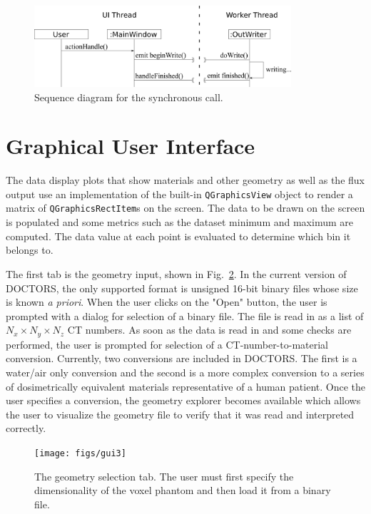 \begin{figure}[tb]
  \begin{center}
   \includegraphics[width=3.75in]{figs/writer_async}
  \end{center}
  \caption{Sequence diagram for the synchronous call.}
\label{fig:async1}
\end{figure}

\section{Graphical User Interface}\label{sec:gui}

The data display plots that show materials and other geometry as well as the flux output use an implementation of the built-in \texttt{QGraphicsView} object to render a matrix of \texttt{QGraphicsRectItem}s on the screen. The data to be drawn on the screen is populated and some metrics such as the dataset minimum and maximum are computed. The data value at each point is evaluated to determine which bin it belongs to. 

The first tab is the geometry input, shown in Fig.~\ref{fig:gui_tab1}. In the current version of DOCTORS, the only supported format is unsigned 16-bit binary files whose size is known \textit{a priori}. When the user clicks on the "Open" button, the user is prompted with a dialog for selection of a binary file. The file is read in as a list of $N_x \times N_y \times N_z$ CT numbers. As soon as the data is read in and some checks are performed, the user is prompted for selection of a CT-number-to-material conversion. Currently, two conversions are included in DOCTORS. The first is a water/air only conversion and the second is a more complex conversion to a series of dosimetrically equivalent materials representative of a human patient. Once the user specifies a conversion, the geometry explorer becomes available which allows the user to visualize the geometry file to verify that it was read and interpreted correctly.

\begin{figure}[tb]
  \begin{center}
   \texttt{[image: figs/gui3]}
  \end{center}
  \caption{The geometry selection tab. The user must first specify the dimensionality of the voxel phantom and then load it from a binary file.}
\label{fig:gui_tab1}
\end{figure}

